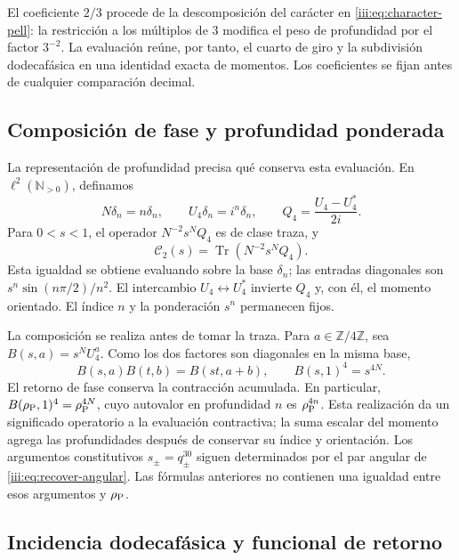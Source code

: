 El coeficiente $2/3$ procede de la descomposición del carácter en
\eqref{iii:eq:character-pell}: la restricción a los múltiplos de $3$
modifica el peso de profundidad por el factor $3^{-2}$. La evaluación
reúne, por tanto, el cuarto de giro y la subdivisión dodecafásica en una
identidad exacta de momentos. Los coeficientes se fijan antes de cualquier
comparación decimal.

\subsection{Composición de fase y profundidad ponderada}

La representación de profundidad precisa qué conserva esta evaluación.
En $\ell^2(\mathbb N_{>0})$, definamos
\[
 N\delta_n=n\delta_n,\qquad U_4\delta_n=i^n\delta_n,
 \qquad Q_4=\frac{U_4-U_4^*}{2i}.
\]
Para $0<s<1$, el operador $N^{-2}s^NQ_4$ es de clase traza, y
\begin{equation}
 \mathcal C_2(s)=\operatorname{Tr}(N^{-2}s^NQ_4).
 \label{iii:eq:pell-depth-trace}
\end{equation}
Esta igualdad se obtiene evaluando sobre la base $\delta_n$; las
entradas diagonales son $s^n\sin(n\pi/2)/n^2$. El intercambio
$U_4\leftrightarrow U_4^*$ invierte $Q_4$ y, con él, el momento
orientado. El índice $n$ y la ponderación $s^n$ permanecen fijos.

La composición se realiza antes de tomar la traza. Para
$a\in\mathbb Z/4\mathbb Z$, sea $B(s,a)=s^NU_4^a$. Como los dos
factores son diagonales en la misma base,
\begin{equation}
 B(s,a)B(t,b)=B(st,a+b),\qquad
 B(s,1)^4=s^{4N}.
 \label{iii:eq:pell-depth-composition}
\end{equation}
El retorno de fase conserva la contracción acumulada. En particular,
$B(\rho_{\rm P},1)^4=\rho_{\rm P}^{4N}$, cuyo autovalor en profundidad
$n$ es $\rho_{\rm P}^{4n}$. Esta realización da un significado
operatorio a la evaluación contractiva; la suma escalar del momento
agrega las profundidades después de conservar su índice y orientación.
Los argumentos constitutivos $s_\pm=q_\pm^{30}$ siguen determinados por
el par angular de \eqref{iii:eq:recover-angular}. Las fórmulas anteriores
no contienen una igualdad entre esos argumentos y $\rho_{\rm P}$.

\subsection{Incidencia dodecafásica y funcional de retorno}

